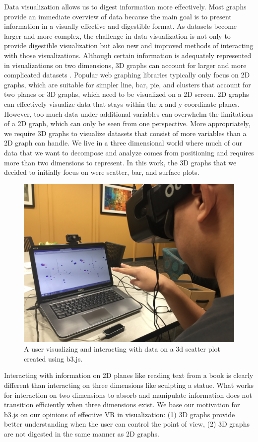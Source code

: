 \documentclass{vgtc}                          %
\begin{document}
Data visualization allows us to digest information more effectively. Most graphs provide an immediate overview of data because the main goal is to present information in a visually effective and digestible format. As datasets become larger and more complex, the challenge in data visualization is not only to provide digestible visualization but also new and improved methods of interacting with those visualizations. Although certain information is adequately represented in visualizations on two dimensions, 3D graphs can account for larger and more complicated datasets \cite{ware2008visualizing}. Popular web graphing libraries typically only focus on 2D graphs, which are suitable for simpler line, bar, pie, and clusters that account for two planes or 3D graphs, which need to be visualized on a 2D screen. 2D graphs can effectively visualize data that stays within the x and y coordinate planes. However, too much data under additional variables can overwhelm the limitations of a 2D graph, which can only be seen from one perspective. More appropriately, we require 3D graphs to visualize datasets that consist of more variables than a 2D graph can handle. We live in a three dimensional world where much of our data that we want to decompose and analyze comes from positioning and requires more than two dimensions to represent. In this work, the 3D graphs that we decided to initially focus on were scatter, bar, and surface plots.

\begin{figure}[t]
\begin{center}
   \includegraphics[width=0.7\linewidth]{figure1}
\end{center}
   \caption{A user visualizing and interacting with data on a 3d scatter plot created using b3.js.}
\end{figure}

Interacting with information on 2D planes like reading text from a book is clearly different than interacting on three dimensions like sculpting a statue. What works for interaction on two dimensions to absorb and manipulate information does not transition efficiently when three dimensions exist. We base our motivation for b3.js on our opinions of effective VR in visualization: (1) 3D graphs provide better understanding when the user can control the point of view, (2) 3D graphs are not digested in the same manner as 2D graphs.
\end{document}
